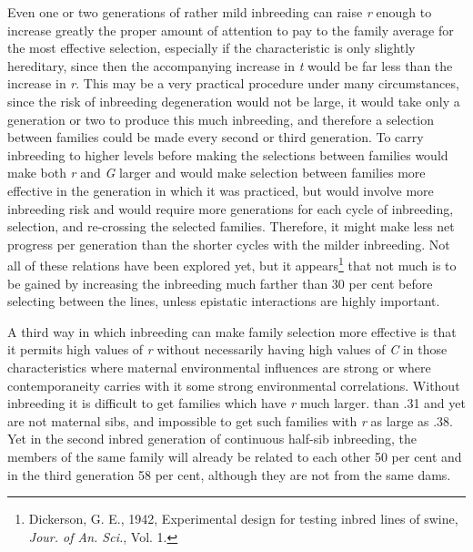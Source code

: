 Even one or two generations of rather mild inbreeding can raise \textit{r}
enough to increase greatly the proper amount of attention to pay to the
family average for the most effective selection, especially if the characteristic
is only slightly hereditary, since then the accompanying increase
in \textit{t} would be far less than the increase in \textit{r}. This may be a very practical
procedure under many circumstances, since the risk of inbreeding
degeneration would not be large, it would take only a generation or
two to produce this much inbreeding, and therefore a selection between
families could be made every second or third generation. To carry
inbreeding to higher levels before making the selections between families
would make both \textit{r} and \textit{G} larger and would make selection between
families more effective in the generation in which it was practiced, but
would involve more inbreeding risk and would require more generations
for each cycle of inbreeding, selection, and re-crossing the selected
families. Therefore, it might make less net progress per generation
than the shorter cycles with the milder inbreeding. Not all of these relations
have been explored yet, but it appears\footnote{Dickerson, G. E., 1942,
Experimental design for testing inbred lines of swine,
\textit{Jour. of An. Sci.}, Vol. 1.} that not much is to be
gained by increasing the inbreeding much farther than 30 per cent
before selecting between the lines, unless epistatic interactions are
highly important.

A third way in which inbreeding can make family selection more
effective is that it permits high values of \textit{r} without necessarily having
high values of \textit{C} in those characteristics where maternal environmental
influences are strong or where contemporaneity carries with it some
strong environmental correlations. Without inbreeding it is difficult to
get families which have \textit{r} much larger. than .31 and yet are not maternal
sibs, and impossible to get such families with \textit{r} as large as .38. Yet in the
second inbred generation of continuous half-sib inbreeding, the members
of the same family will already be related to each other 50 per cent
and in the third generation 58 per cent, although they are not from the
same dams.

